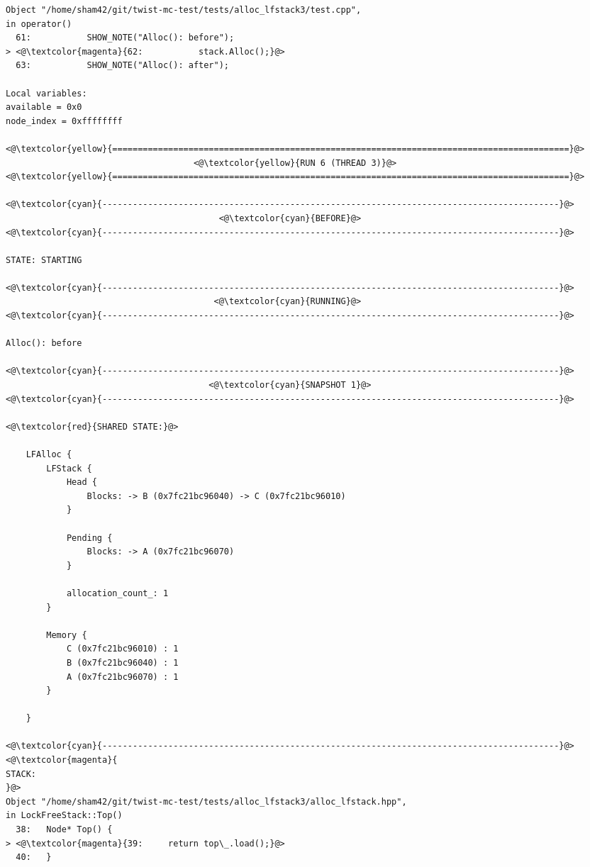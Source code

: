 \begin{adjustwidth}{-3.3cm}{-1cm}
\begin{allintypewriter}
\begin{multicols*}{2}
\begin{lstlisting}[numbers=none]
Object "/home/sham42/git/twist-mc-test/tests/alloc_lfstack3/test.cpp",
in operator()
  61:           SHOW_NOTE("Alloc(): before");
> <@\textcolor{magenta}{62:           stack.Alloc();}@>
  63:           SHOW_NOTE("Alloc(): after");

Local variables: 
available = 0x0
node_index = 0xffffffff

<@\textcolor{yellow}{==========================================================================================}@>
                                     <@\textcolor{yellow}{RUN 6 (THREAD 3)}@>
<@\textcolor{yellow}{==========================================================================================}@>

<@\textcolor{cyan}{------------------------------------------------------------------------------------------}@>
                                          <@\textcolor{cyan}{BEFORE}@>
<@\textcolor{cyan}{------------------------------------------------------------------------------------------}@>

STATE: STARTING

<@\textcolor{cyan}{------------------------------------------------------------------------------------------}@>
                                         <@\textcolor{cyan}{RUNNING}@>
<@\textcolor{cyan}{------------------------------------------------------------------------------------------}@>

Alloc(): before

<@\textcolor{cyan}{------------------------------------------------------------------------------------------}@>
                                        <@\textcolor{cyan}{SNAPSHOT 1}@>
<@\textcolor{cyan}{------------------------------------------------------------------------------------------}@>

<@\textcolor{red}{SHARED STATE:}@>

    LFAlloc {
	    LFStack {
		    Head {
			    Blocks: -> B (0x7fc21bc96040) -> C (0x7fc21bc96010) 
		    }

		    Pending {
			    Blocks: -> A (0x7fc21bc96070) 
		    }

		    allocation_count_: 1
	    }

	    Memory {
		    C (0x7fc21bc96010) : 1
		    B (0x7fc21bc96040) : 1
		    A (0x7fc21bc96070) : 1
	    }

    }

<@\textcolor{cyan}{------------------------------------------------------------------------------------------}@>
<@\textcolor{magenta}{
STACK:
}@>
Object "/home/sham42/git/twist-mc-test/tests/alloc_lfstack3/alloc_lfstack.hpp",
in LockFreeStack::Top()
  38:   Node* Top() {
> <@\textcolor{magenta}{39:     return top\_.load();}@>
  40:   }


\end{lstlisting}
\end{multicols*}
\end{allintypewriter}
\end{adjustwidth}
